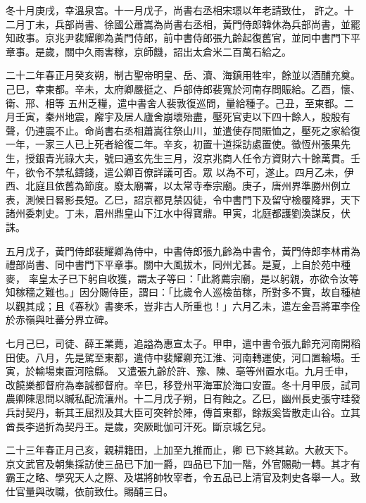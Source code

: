 \begin{pinyinscope}
 冬十月庚戌，幸溫泉宮。十一月戊子，尚書右丞相宋璟以年老請致仕，
 許之。十二月丁未，兵部尚書、徐國公蕭嵩為尚書右丞相，黃門侍郎韓休為兵部尚書，並罷知政事。京兆尹裴耀卿為黃門侍郎，前中書侍郎張九齡起復舊官，並同中書門下平章事。是歲，關中久雨害稼，京師饑，詔出太倉米二百萬石給之。



 二十二年春正月癸亥朔，制古聖帝明皇、岳、瀆、海鎮用牲牢，餘並以酒酺充奠。己巳，幸東都。辛未，太府卿嚴挺之、戶部侍郎裴寬於河南存問賑給。乙酉，懷、衛、邢、相等
 五州乏糧，遣中書舍人裴敦復巡問，量給種子。己丑，至東都。二月壬寅，秦州地震，廨宇及居人廬舍崩壞殆盡，壓死官吏以下四十餘人，殷殷有聲，仍連震不止。命尚書右丞相蕭嵩往祭山川，並遣使存問賑恤之，壓死之家給復一年，一家三人已上死者給復二年。辛亥，初置十道採訪處置使。徵恆州張果先生，授銀青光祿大夫，號曰通玄先生三月，沒京兆商人任令方資財六十餘萬貫。壬午，欲令不禁私鑄錢，遣公卿百僚詳議可否。眾
 以為不可，遂止。四月乙未，伊西、北庭且依舊為節度。廢太廟署，以太常寺奉宗廟。庚子，唐州界準勝州例立表，測候日晷影長短。乙巳，詔京都見禁囚徒，令中書門下及留守檢覆降罪，天下諸州委刺史。丁未，眉州鼎皇山下江水中得寶鼎。甲寅，北庭都護劉渙謀反，伏誅。



 五月戊子，黃門侍郎裴耀卿為侍中，中書侍郎張九齡為中書令，黃門侍郎李林甫為禮部尚書、同中書門下平章事。關中大風拔木，同州尤甚。是夏，上自於苑中種麥，
 率皇太子已下躬自收獲，謂太子等曰：「此將薦宗廟，是以躬親，亦欲令汝等知稼穡之難也。」因分賜侍臣，謂曰：「比歲令人巡檢苗稼，所對多不實，故自種植以觀其成；且《春秋》書麥禾，豈非古人所重也！」六月乙未，遣左金吾將軍李佺於赤嶺與吐蕃分界立碑。



 七月己巳，司徒、薛王業薨，追謚為惠宣太子。甲申，遣中書令張九齡充河南開稻田使。八月，先是駕至東都，遣侍中裴耀卿充江淮、河南轉運使，河口置輸場。壬寅，於輸場東置河陰縣。
 又遣張九齡於許、豫、陳、亳等州置水屯。九月壬申，改饒樂都督府為奉誠都督府。辛巳，移登州平海軍於海口安置。冬十月甲辰，試司農卿陳思問以贓私配流瀼州。十二月戊子朔，日有蝕之。乙巳，幽州長史張守珪發兵討契丹，斬其王屈烈及其大臣可突幹於陣，傳首東都，餘叛奚皆散走山谷。立其酋長李過折為契丹王。是歲，突厥毗伽可汗死。斷京城乞兒。



 二十三年春正月己亥，親耕籍田，上加至九推而止，卿
 已下終其畝。大赦天下。京文武官及朝集採訪使三品已下加一爵，四品已下加一階，外官賜勛一轉。其才有霸王之略、學究天人之際、及堪將帥牧宰者，令五品已上清官及刺史各舉一人。致仕官量與改職，依前致仕。賜酺三日。




\end{pinyinscope}
